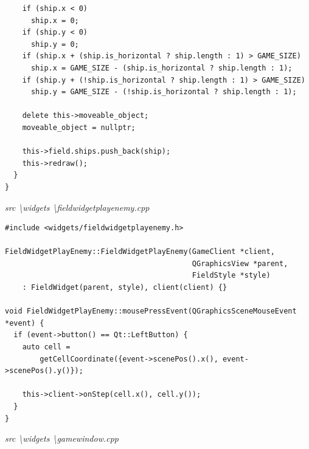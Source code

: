 \documentclass[a4paper,14pt]{extarticle}
\begin{document}
\begin{verbatim}
    if (ship.x < 0)
      ship.x = 0;
    if (ship.y < 0)
      ship.y = 0;
    if (ship.x + (ship.is_horizontal ? ship.length : 1) > GAME_SIZE)
      ship.x = GAME_SIZE - (ship.is_horizontal ? ship.length : 1);
    if (ship.y + (!ship.is_horizontal ? ship.length : 1) > GAME_SIZE)
      ship.y = GAME_SIZE - (!ship.is_horizontal ? ship.length : 1);

    delete this->moveable_object;
    moveable_object = nullptr;

    this->field.ships.push_back(ship);
    this->redraw();
  }
}

\end{verbatim}
\textit{src \textbackslash widgets \textbackslash fieldwidgetplayenemy.cpp}
\begin{verbatim}
#include <widgets/fieldwidgetplayenemy.h>

FieldWidgetPlayEnemy::FieldWidgetPlayEnemy(GameClient *client,
                                           QGraphicsView *parent,
                                           FieldStyle *style)
    : FieldWidget(parent, style), client(client) {}

void FieldWidgetPlayEnemy::mousePressEvent(QGraphicsSceneMouseEvent *event) {
  if (event->button() == Qt::LeftButton) {
    auto cell =
        getCellCoordinate({event->scenePos().x(), event->scenePos().y()});

    this->client->onStep(cell.x(), cell.y());
  }
}

\end{verbatim}
\textit{src \textbackslash widgets \textbackslash gamewindow.cpp}
\end{document}
